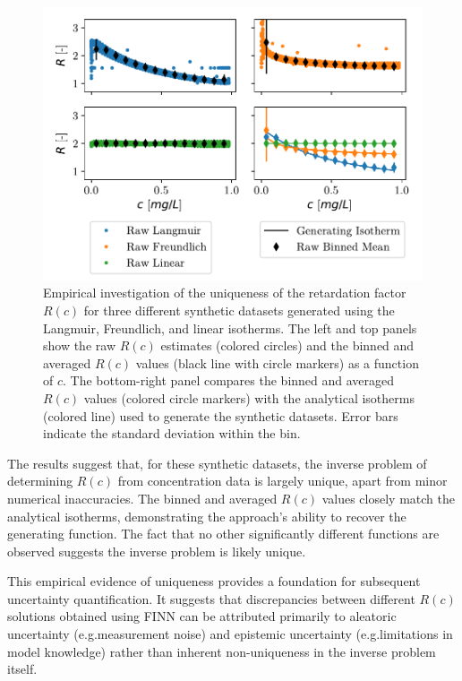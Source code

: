 \begin{figure}[h!]
    \centering
    \includegraphics{figs/ret_uniqueness.pdf}
    \caption{Empirical investigation of the uniqueness of the retardation factor $R(c)$ for three different synthetic datasets generated using the Langmuir, Freundlich, and linear isotherms. The left and top panels show the raw $R(c)$ estimates (colored circles) and the binned and averaged $R(c)$ values (black line with circle markers) as a function of $c$. The bottom-right panel compares the binned and averaged $R(c)$ values (colored circle markers) with the analytical isotherms (colored line) used to generate the synthetic datasets. Error bars indicate the standard deviation within the bin.}
    \label{fig:ret_uniqueness}
\end{figure}

The results suggest that, for these synthetic datasets, the inverse problem of determining $R(c)$ from concentration data is largely unique, apart from minor numerical inaccuracies. The binned and averaged $R(c)$ values closely match the analytical isotherms, demonstrating the approach's ability to recover the generating function. The fact that no other significantly different functions are observed suggests the inverse problem is likely unique.

This empirical evidence of uniqueness provides a foundation for subsequent uncertainty quantification. It suggests that discrepancies between different $R(c)$ solutions obtained using FINN can be attributed primarily to aleatoric uncertainty (e.g.\@ measurement noise) and epistemic uncertainty (e.g.\@ limitations in model knowledge) rather than inherent non-uniqueness in the inverse problem itself.



